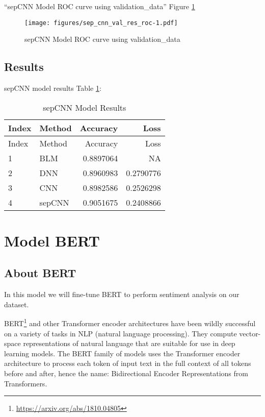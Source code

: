 \documentclass[
]{article}
\DeclareRobustCommand{\href}[2]{#2\footnote{\url{#1}}}
\begin{document}
``sepCNN Model ROC curve using validation\_data'' Figure
\ref{fig:model_19}

\begin{figure}
\centering
\texttt{[image: figures/sep\_cnn\_val\_res\_roc-1.pdf]}
\caption{sepCNN Model ROC curve using
validation\_data\label{fig:model_19}}
\end{figure}

\newpage

\hypertarget{results-3}{%
\subsection{Results}\label{results-3}}

sepCNN model results Table \ref{tbl:sep_cnn_results_table}:

\begin{longtable}[]{@{}llrr@{}}
\caption{sepCNN Model
Results\label{tbl:sep_cnn_results_table}}\tabularnewline
\toprule
Index & Method & Accuracy & Loss \\
\midrule
\endfirsthead
\toprule
Index & Method & Accuracy & Loss \\
\midrule
\endhead
1 & BLM & 0.8897064 & NA \\
2 & DNN & 0.8960983 & 0.2790776 \\
3 & CNN & 0.8982586 & 0.2526298 \\
4 & sepCNN & 0.9051675 & 0.2408866 \\
\bottomrule
\end{longtable}

\newpage

\hypertarget{model-bert}{%
\section{Model BERT}\label{model-bert}}

\hypertarget{about-bert}{%
\subsection{About BERT}\label{about-bert}}

In this model we will fine-tune BERT to perform sentiment analysis on
our dataset.

\href{https://arxiv.org/abs/1810.04805}{BERT} and other Transformer
encoder architectures have been wildly successful on a variety of tasks
in NLP (natural language processing). They compute vector-space
representations of natural language that are suitable for use in deep
learning models. The BERT family of models uses the Transformer encoder
architecture to process each token of input text in the full context of
all tokens before and after, hence the name: Bidirectional Encoder
Representations from Transformers.
\end{document}
